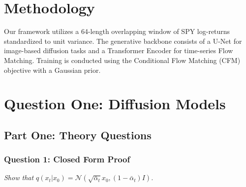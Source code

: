 \documentclass[a4paper,12pt]{article}
\begin{document}
\section{Methodology}
Our framework utilizes a 64-length overlapping window of SPY log-returns standardized to unit variance. The generative backbone consists of a U-Net for image-based diffusion tasks and a Transformer Encoder for time-series Flow Matching. Training is conducted using the Conditional Flow Matching (CFM) objective with a Gaussian prior.
\section{Question One: Diffusion Models}

\subsection{Part One: Theory Questions}

\subsubsection{Question 1: Closed Form Proof}
\textit{Show that $q(x_t | x_0) = \mathcal{N}(\sqrt{\bar{\alpha}_t} x_0, (1 - \bar{\alpha}_t) I)$.}
\end{document}
